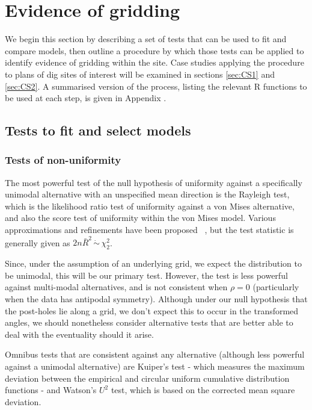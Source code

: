 \documentclass[../../ArchStats.tex]{subfiles}
\begin{document}

\section{Evidence of gridding}

We begin this section by describing a set of tests that can be used to fit and compare models, then outline a procedure by which those tests can be applied to identify evidence of gridding within the site. Case studies applying the procedure to plans of dig sites of interest will be examined in sections \ref{sec:CS1} and \ref{sec:CS2}. A summarised version of the process, listing the relevant R functions to be used at each step, is given in Appendix .


\subsection{Tests to fit and select models}
\label{sec:model-fitting-tests}

\subsubsection{Tests of non-uniformity}
\label{sec:unif-tests}

The most powerful test of the null hypothesis of uniformity against a specifically unimodal alternative with an unspecified mean direction is the Rayleigh test, which is the likelihood ratio test of uniformity against a von Mises alternative, and also the score test of uniformity within the von Mises model. Various approximations and refinements have been proposed ~\cite{Mardia1999}, but the test statistic is generally given as $2n\bar{R}^2 \, \dot{\sim} \, \chi^2_2$.

Since, under the assumption of an underlying grid, we expect the distribution to be unimodal, this will be our primary test. However, the test is less powerful against multi-modal alternatives, and is not consistent when $\rho = 0$ (particularly when the data has antipodal symmetry). Although under our null hypothesis that the post-holes lie along a grid, we don't expect this to occur in the transformed angles, we should nonetheless consider alternative tests that are better able to deal with the eventuality should it arise.

Omnibus tests that are consistent against any alternative (although less powerful against a unimodal alternative) are Kuiper's test - which measures the maximum deviation between the empirical and circular uniform cumulative distribution functions - and Watson's $U^2$ test, which is based on the corrected mean square deviation. 
\end{document}
